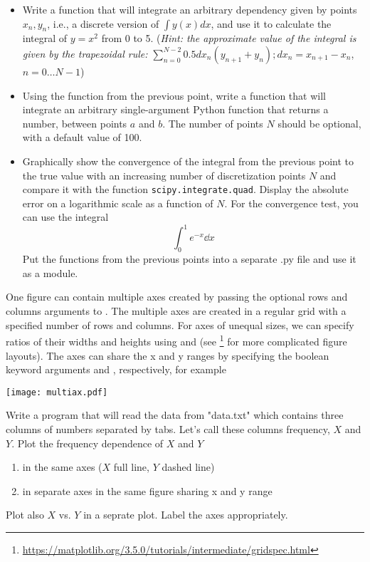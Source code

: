 \begin{exercise}
    \begin{itemize}
    \item Write a function that will integrate an arbitrary dependency given by points $x_n, y_n$, i.e., a discrete version of $\int y(x)dx$, and use it to calculate the integral of $y = x^2$ from 0 to 5. (\emph{Hint: the approximate value of the integral is given by the trapezoidal rule: $\sum_{n=0}^{N-2} 0.5 dx_n(y_{n+1} + y_n); dx_n = x_{n+1} - x_n$}, $n = 0 \dots N-1$)

    \item Using the function from the previous point, write a function that will integrate an arbitrary single-argument Python function that returns a number, between points $a$ and $b$. The number of points $N$ should be optional, with a default value of 100.

    \item Graphically show the convergence of the integral from the previous point to the true value with an increasing number of discretization points $N$ and compare it with the function \verb|scipy.integrate.quad|. Display the absolute error on a logarithmic scale as a function of $N$. For the convergence test, you can use the integral
    \[ \int_0^1 e^{-x} \dd x \]
    Put the functions from the previous points into a separate .py file and use it as a module.
    \end{itemize}
\end{exercise}

One figure can contain multiple axes created by passing the optional rows and columns arguments to . The multiple axes are created in a regular grid with a specified number of rows and columns. For axes of unequal sizes, we can specify ratios of their widths and heights using  and  (see  \footnote{\url{https://matplotlib.org/3.5.0/tutorials/intermediate/gridspec.html}} for more complicated figure layouts). The axes can share the x and y ranges by specifying the boolean keyword arguments  and , respectively, for example

\begin{center}
    \texttt{[image: multiax.pdf]}
\end{center}
\begin{exercise}
    \label{ex:peak}
    Write a program that will read the data from "data.txt" which contains three columns of numbers separated by tabs. Let's call these columns frequency, $X$ and $Y$. Plot the frequency dependence of $X$ and $Y$ 
    \begin{enumerate}
        \item in the same axes ($X$ full line, $Y$ dashed line)
        \item in separate axes in the same figure sharing x and y range
    \end{enumerate}
    Plot also $X$ vs. $Y$ in a seprate plot. Label the axes appropriately.
\end{exercise}

